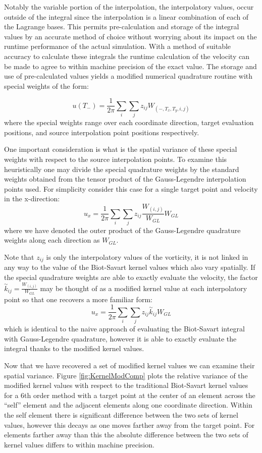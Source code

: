 \documentclass[]{aiaa-tc}%
\newcommand{\be}{\begin{equation}}
\newcommand{\ee}{\end{equation}}
\begin{document}
Notably the variable portion of the interpolation, the interpolatory values, occur outside of the integral since the interpolation is a linear combination of each of the Lagrange bases. This permits pre-calculation and storage of the integral values by an accurate method of choice without worrying about its impact on the runtime performance of the actual simulation. With a method of suitable accuracy to calculate these integrals the runtime calculation of the velocity can be made to agree to within machine precision of the exact value. The storage and use of pre-calculated values yields a modified numerical quadrature routine with special weights of the form:

\be u(T_-)= \frac{1}{2 \pi} \sum_i \sum_j z_{ij} W_{(-, T_x,T_y,i,j)} \ee
where the special weights range over each coordinate direction, target evaluation positions, and source interpolation point positions respectively.

One important consideration is what is the spatial variance of these special weights with respect to the source interpolation points. To examine this heuristically one may divide the special quadrature weights by the standard weights obtained from the tensor product of the Gauss-Legendre interpolation points used. For simplicity consider this case for a single target point and velocity in the x-direction:
\be u_x= \frac{1}{2 \pi} \sum_i \sum_j z_{ij} \frac{W_{(i,j)}}{W_{GL}} W_{GL} \ee
where we have denoted the outer product of the Gauss-Legendre quadrature weights along each direction as $W_{GL}$.

Note that $z_{ij}$ is only the interpolatory values of the vorticity, it is not linked in any way to the value of the Biot-Savart kernel values which also vary spatially. If the special quadrature weights are able to exactly evaluate the velocity, the factor $\overset{\sim}{k}_{ij} = \frac{W_{(i,j)}}{W_{GL}}$ may be thought of as a modified kernel value at each interpolatory point so that one recovers a more familiar form:
\be u_x= \frac{1}{2 \pi} \sum_i \sum_j z_{ij}  \overset{\sim}{k}_{ij} W_{GL} \ee
which is identical to the naive approach of evaluating the Biot-Savart integral with Gauss-Legendre quadrature, however it is able to exactly evaluate the integral thanks to the modified kernel values.

Now that we have recovered a set of modified kernel values we can examine their spatial variance. Figure \ref{fig:KernelModComp} plots the relative variance of the modified kernel values with respect to the traditional Biot-Savart kernel values for a 6th order method with a target point at the center of an element across the ``self'' element and the adjacent elements along one coordinate direction. Within the self element there is significant difference between the two sets of kernel values, however this decays as one moves farther away from the target point. For elements farther away than this the absolute difference between the two sets of kernel values differs to within machine precision.
\end{document}
